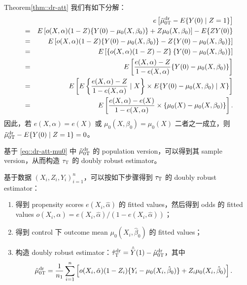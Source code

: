 \begin{myproof}{Theorem}{\ref{thm::dr-att}}
我们有如下分解：
\begin{eqnarray*}
&&  e\left[  \tilde{\mu}_{0\textsc{T}}^\text{dr}  -  E\{ Y(0) \mid Z=1 \} \right] \\
&=& E\left[ o(X,\alpha) ( 1-Z )  \{ Y(0) - \mu_0(X, \beta_0) \} + Z  \mu_0(X, \beta_0) \right] -  E\{ Z Y(0)   \} \\
&=& E\left[ o(X,\alpha) ( 1-Z ) \{ Y(0) - \mu_0(X, \beta_0) \} - Z  \{ Y (0) - \mu_0(X, \beta_0) \} \right] \\
&=& E\left[ \left\{ o(X,\alpha)  ( 1-Z  ) -Z\right\} \{ Y (0) - \mu_0(X, \beta_0) \}   \right] \\
&=& E\left[    \frac{ e(X,\alpha) - Z  }{1-  e(X,\alpha)}   \{ Y (0) - \mu_0(X, \beta_0) \}   \right] \\
&=& E\left[  E\left\{   \frac{ e(X,\alpha) - Z  }{1-  e(X,\alpha)}  \mid X \right\}  \times E  \{ Y (0) - \mu_0(X, \beta_0)  \mid X\}   \right] \\
&=& E\left[   \frac{ e(X,\alpha) - e(X)  }{1-  e(X,\alpha)} \times    \{ \mu_0(X) - \mu_0(X, \beta_0)  \}   \right] .
\end{eqnarray*}
因此，若 $ e(X,\alpha) = e(X)$ 或 $\mu_0(X, \beta_0)=\mu_0(X) $ 二者之一成立，则 $\tilde{\mu}_{0\textsc{T}}^\text{dr}  -  E\{ Y(0) \mid Z=1 \}  = 0$。
\end{myproof}


基于 \eqref{eq::dr-att-mu0} 中 $\tilde{\mu}_{0\textsc{T}}^\text{dr}$ 的 population version，可以得到其 sample version，从而构造 $\tau_\textsc{T}$ 的 doubly robust estimator。

\begin{definition}
\label{def::dr-att}
基于数据 $(X_i, Z_i, Y_i)_{i=1}^n$，可以按如下步骤得到 $\tau_\textsc{T}$ 的 doubly robust estimator：
\begin{enumerate}
[(1)]
\item
得到 propensity scores $e(X_i, \hat{\alpha})$ 的 fitted values，然后得到 odds 的 fitted values $o(X_i, \hat{\alpha})  =  e(X_i, \hat{\alpha}) / (1- e(X_i, \hat{\alpha}))$；
\item
得到 control 下 outcome mean $ \mu_0(X_i, \hat{\beta}_0) $ 的 fitted values；
\item
构造 doubly robust estimator：$\hat{\tau}_\textsc{T}^\textup{dr} = \hat{\bar{Y}}(1) - \hat{\mu}_{0\textsc{T}}^\textup{dr}$，其中
$$
 \hat{\mu}_{0\textsc{T}}^\textup{dr}  
 = \frac{1}{n_1} \sum_{i=1}^n \left[ o(X_i,\hat{\alpha}) (1-Z_i)\{ Y_i-\mu_0(X_i, \hat{\beta}_0) \}      +Z_i \mu_0(X_i, \hat{\beta}_0)       \right].
$$
\end{enumerate}
\end{definition}


